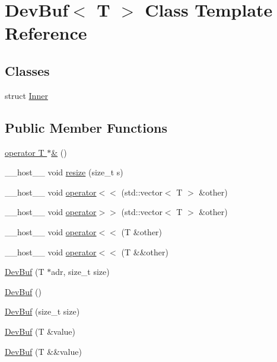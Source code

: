 \hypertarget{classDevBuf}{\section{Dev\-Buf$<$ T $>$ Class Template Reference}
\label{classDevBuf}
}
\subsection*{Classes}
\begin{DoxyCompactItemize}
\item 
struct \hyperlink{structDevBuf_1_1Inner}{Inner}
\end{DoxyCompactItemize}
\subsection*{Public Member Functions}
\begin{DoxyCompactItemize}
\item 
\hyperlink{classDevBuf_a52ff1e60d431100ce54a55817419b315}{operator T $\ast$\&} ()
\item 
\-\_\-\-\_\-host\-\_\-\-\_\- void \hyperlink{classDevBuf_a9f5ff580d9fb09b82329192b1b26cc8e}{resize} (size\-\_\-t s)
\item 
\-\_\-\-\_\-host\-\_\-\-\_\- void \hyperlink{classDevBuf_a6feac4055843941e0ab56c65eb1b3a85}{operator$<$$<$} (std\-::vector$<$ T $>$ \&other)
\item 
\-\_\-\-\_\-host\-\_\-\-\_\- void \hyperlink{classDevBuf_a7d119613553a41d742d43d1b073ab9ba}{operator$>$$>$} (std\-::vector$<$ T $>$ \&other)
\item 
\-\_\-\-\_\-host\-\_\-\-\_\- void \hyperlink{classDevBuf_a77e5a003ef86028a7afca6e124357df2}{operator$<$$<$} (T \&other)
\item 
\-\_\-\-\_\-host\-\_\-\-\_\- void \hyperlink{classDevBuf_a016429f31d351446949de46659c4077d}{operator$<$$<$} (T \&\&other)
\item 
\hyperlink{classDevBuf_ac998972db52882f366d7d135de36e606}{Dev\-Buf} (T $\ast$adr, size\-\_\-t size)
\item 
\hyperlink{classDevBuf_a7fd2f18cba26001aa5a9af661722a34d}{Dev\-Buf} ()
\item 
\hyperlink{classDevBuf_a6aa3b007393eb6b2a9aeffafd73ab020}{Dev\-Buf} (size\-\_\-t size)
\item 
\hyperlink{classDevBuf_aca1cbb0b62fa2dd223b7b9f239a0e616}{Dev\-Buf} (T \&value)
\item 
\hyperlink{classDevBuf_a631b37030d61e74ff8e46f69e53e35d6}{Dev\-Buf} (T \&\&value)
\end{DoxyCompactItemize}
